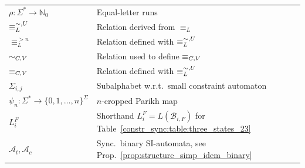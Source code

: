 \begin{longtable}{p{} p{} p{}}
 	$\rho \colon \Sigma^* \to \mathbb N_0$ & Equal-letter runs & \pageref{def:rho} \\
	$\mathrel{\equiv_{L}^{\sim, U}}$ & Relation derived from $\equiv_L$ & \pageref{def:Nerode-generalization} \\
	$\equiv_{L}^{>n}$  & Relation defined with $\mathrel{\equiv_{L}^{\sim, U}}$ & \pageref{def:equivLn}  \\
	$\mathrel{\sim_{C, V}}$  & Relation used to define $\mathrel{\equiv_{C, V}}$ & \pageref{def:preeqLL}  \\		
	$\mathrel{\equiv_{C, V}}$      & Relation defined with $\mathrel{\equiv_{L}^{\sim, U}}$  & \pageref{def:eqLL} \\ 
	$\Sigma_{i,j}$ & Subalphabet w.r.t.~small constraint automaton & \pageref{def:Sigmaij} \\
	$\psi_n \colon \Sigma^* \to \{0,1,\ldots,n\}^{\Sigma}$ & $n$-cropped Parikh map & \pageref{def:n-cropped-Parikh-map} \\
	$L_i^F$ & Shorthand $L_i^F = L(\mathcal B_{i,F})$ for Table~\ref{constr_sync:table:three_states_23} & \pageref{def:LiFnotation} \\		
	$\mathcal A_t, \mathcal A_c$ & Sync.~binary SI-automata, see Prop.~\ref{prop:structure_simp_idem_binary} & \pageref{def:AtAc}
\end{longtable}